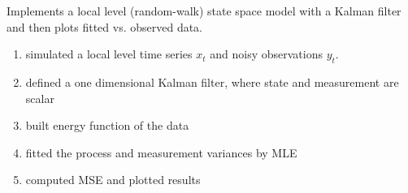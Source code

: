 Implements a local level (random-walk) state space model with a Kalman filter and then plots fitted vs. observed data.
\begin{enumerate}
    \item simulated a local level time series $x_t$ and noisy observations $y_t$.
    \item defined a one dimensional Kalman filter, where state and measurement are scalar
    \item built energy function of the data 
    \item fitted the process and measurement variances by MLE
    \item computed MSE and plotted results
\end{enumerate}

